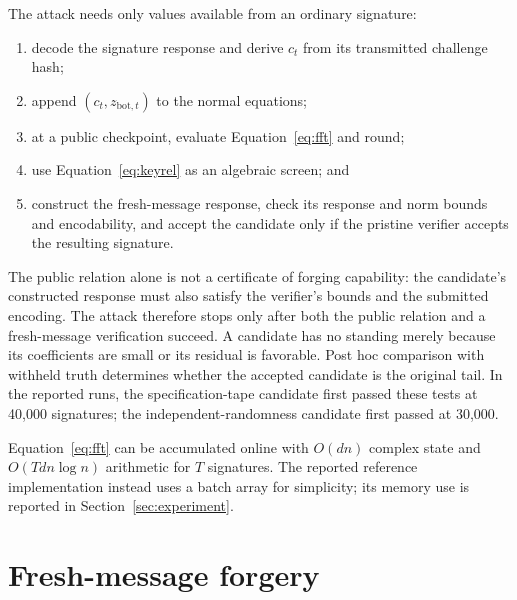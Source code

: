 \documentclass[11pt,a4paper]{article}
\begin{document}
The attack needs only values available from an ordinary signature:
\begin{enumerate}[leftmargin=1.7em]
  \item decode the signature response and derive $c_t$ from its transmitted
        challenge hash;
  \item append $(c_t,z_{\mathrm{bot},t})$ to the normal equations;
  \item at a public checkpoint, evaluate Equation~\eqref{eq:fft} and round;
  \item use Equation~\eqref{eq:keyrel} as an algebraic screen; and
  \item construct the fresh-message response, check its response and norm
        bounds and encodability, and accept the candidate only if the pristine
        verifier accepts the resulting signature.
\end{enumerate}
The public relation alone is not a certificate of forging capability: the
candidate's constructed response must also satisfy the verifier's bounds and
the submitted encoding.  The attack therefore stops only after both the
public relation and a fresh-message verification succeed.  A candidate has no
standing merely because its coefficients are small or its residual is
favorable.  Post hoc comparison with withheld truth determines whether the
accepted candidate is the original tail.  In the reported runs, the
specification-tape candidate first passed these tests at 40,000 signatures;
the independent-randomness candidate first passed at 30,000.

Equation~\eqref{eq:fft} can be accumulated online with $O(dn)$ complex state
and $O(Tdn\log n)$ arithmetic for $T$ signatures.  The reported reference
implementation instead uses a batch array for simplicity; its memory use is
reported in Section~\ref{sec:experiment}.

\section{Fresh-message forgery}
\label{sec:forgery}
\end{document}
